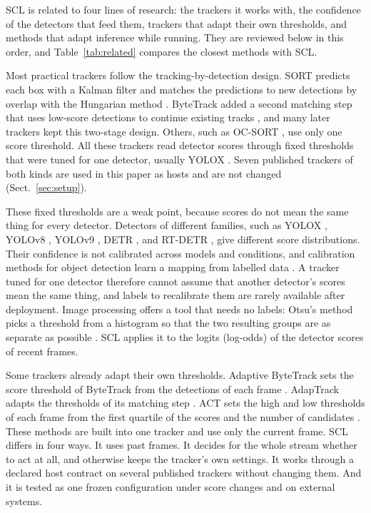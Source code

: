 \documentclass[pdflatex,sn-mathphys-num,iicol]{sn-jnl}
\makeatletter
\def\sectionfont{\reset@font\fontfamily{\rmdefault}\fontsize{11bp}{13bp}\bfseries\selectfont\raggedright\boldmath}
\renewcommand\section{\@startsection{section}{1}{\z@}{-8pt \@plus -2pt \@minus -2pt}{4pt}{\sectionfont}}
\newcommand{\scl}{SCL}
\makeatother
\begin{document}
\section{Related Work}\label{sec:related}

\scl{} is related to four lines of research: the trackers it works with, the
confidence of the detectors that feed them, trackers that adapt their own
thresholds, and methods that adapt inference while running. They are
reviewed below in this order, and Table~\ref{tab:related} compares the
closest methods with \scl{}.

Most practical trackers follow the tracking-by-detection design. SORT
predicts each box with a Kalman filter and matches the predictions to new
detections by overlap with the Hungarian method \cite{bewley2016sort}.
ByteTrack added a second matching step that uses low-score detections to
continue existing tracks \cite{zhang2022bytetrack}, and many later trackers
kept this two-stage design. Others, such as OC-SORT \cite{cao2023ocsort}, use
only one score threshold. All these trackers read detector scores through
fixed thresholds that were tuned for one detector, usually YOLOX
\cite{ge2021yolox}. Seven published trackers of both kinds are used in this
paper as hosts and are not changed (Sect.~\ref{sec:setup}).

These fixed thresholds are a weak point, because scores do not mean the same
thing for every detector. Detectors of different families, such as YOLOX
\cite{ge2021yolox}, YOLOv8 \cite{jocher2023yolov8}, YOLOv9
\cite{wang2024yolov9}, DETR \cite{carion2020detr}, and RT-DETR
\cite{zhao2024rtdetr}, give different score distributions. Their confidence
is not calibrated across models and conditions, and calibration methods for
object detection learn a mapping from labelled data
\cite{kuppers2020detcalib}. A tracker tuned for one detector therefore cannot
assume that another detector's scores mean the same thing, and labels to
recalibrate them are rarely available after deployment. Image processing
offers a tool that needs no labels: Otsu's method picks a threshold from a
histogram so that the two resulting groups are as separate as possible
\cite{otsu1979}. \scl{} applies it to the logits (log-odds) of the detector
scores of recent frames.

Some trackers already adapt their own thresholds. Adaptive ByteTrack sets the
score threshold of ByteTrack from the detections of each frame
\cite{ma2023adaptivebytetrack}. AdapTrack adapts the thresholds of its
matching step \cite{shim2024adaptrack}. ACT sets the high and low thresholds
of each frame from the first quartile of the scores and the number of
candidates \cite{act2026adaptive}. These methods are built into one tracker
and use only the current frame. \scl{} differs in four ways. It uses past
frames. It decides for the whole stream whether to act at all, and otherwise
keeps the tracker's own settings. It works through a declared host contract
on several published trackers without changing them. And it is tested as one
frozen configuration under score changes and on external systems.
\end{document}
